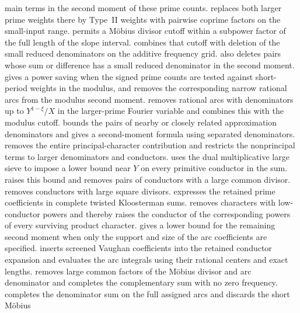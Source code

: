\documentclass[11pt,a4paper]{article}
\numberwithin{equation}{section}
\begin{document}
main terms in the second moment of these prime counts.
 replaces both larger
prime weights there by Type~II weights with pairwise
coprime factors on the small-input range.
 permits a M\"obius
divisor cutoff within a subpower factor of the full
length of the slope interval.
 combines that cutoff
with deletion of the small reduced denominators on the
additive frequency grid.
 also deletes pairs whose
sum or difference has a small reduced denominator in the
second moment.
 gives a power saving
when the signed prime counts are tested against short-period
weights in the modulus, and removes the corresponding narrow
rational arcs from the modulus second moment.
 removes rational arcs with
denominators up to $Y^{1-\xi}/X$ in the larger-prime
Fourier variable and combines this with the modulus cutoff.
 bounds the pairs
of nearby or closely related approximation denominators
and gives a second-moment formula using separated denominators.
 removes the entire
principal-character contribution and restricts the nonprincipal
terms to larger denominators and conductors.
 uses the dual
multiplicative large sieve to impose a lower bound near $Y$
on every primitive conductor in the sum.
 raises this bound and
removes pairs of conductors with a large common divisor.
 removes conductors with large
square divisors.  expresses the
retained prime coefficients in complete twisted Kloosterman sums.
 removes characters with
low-conductor powers and thereby raises the conductor of the
corresponding powers of every surviving product character.
 gives a lower bound for the
remaining second moment when only the support and size of the arc
coefficients are specified.
 inserts screened Vaughan
coefficients into the retained conductor expansion and evaluates
the arc integrals using their rational centers and exact lengths.
 removes large common factors of
the M\"obius divisor and arc denominator and completes the
complementary sum with no zero frequency.
 completes the denominator
sum on the full assigned arcs and discards the short M\"obius
\end{document}
